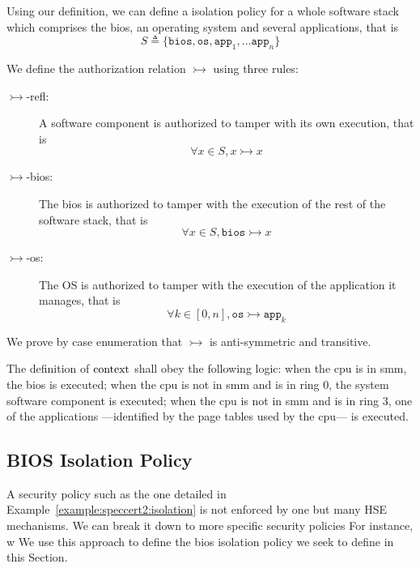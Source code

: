 \begin{example}
  \label{example:speccert2:isolation}
  Using our definition, we can define a isolation policy for a whole software
  stack which comprises the \ac{bios}, an operating system and several
  applications, that is
  \[
    S \triangleq \{ \mathtt{bios}, \mathtt{os}, \mathtt{app}_1, \dots
    \mathtt{app}_n \}
  \]

  We define the authorization relation $\rightarrowtail$ using three rules:
  \begin{description}
  \item [\(\rightarrowtail\)-refl:] A software component is authorized to tamper
    with its own execution, that is
    \[ \forall x \in S, x \rightarrowtail x \]
  \item [\(\rightarrowtail\)-bios:] The \ac{bios} is authorized to tamper with
    the execution of the rest of the software stack, that is
    \[ \forall x \in S, \mathtt{bios} \rightarrowtail x \]
  \item [\(\rightarrowtail\)-os:] The OS is authorized to tamper with the
    execution of the application it manages, that is
    \[ \forall k \in [0, n], \mathtt{os} \rightarrowtail \mathtt{app}_k \]
  \end{description}

  We prove by case enumeration that $\rightarrowtail$ is anti-symmetric and
  transitive.

  The definition of $\mathrm{context}$ shall obey the following logic: when the
  \ac{cpu} is in \ac{smm}, the \ac{bios} is executed; when the \ac{cpu} is not
  in \ac{smm} and is in ring 0, the system software component is executed; when
  the \ac{cpu} is not in \ac{smm} and is in ring 3, one of the applications
  ---identified by the page tables used by the \ac{cpu}--- is executed.
\end{example}

\subsection{BIOS Isolation Policy}
\label{subsec:speccert:biossec}

A security policy such as the one detailed in
Example~\ref{example:speccert2:isolation} is not enforced by one but many HSE
mechanisms.
%
We can break it down to more specific security policies
%
For instance, w
We use this approach to define the \ac{bios} isolation policy we seek to define
in this Section.

